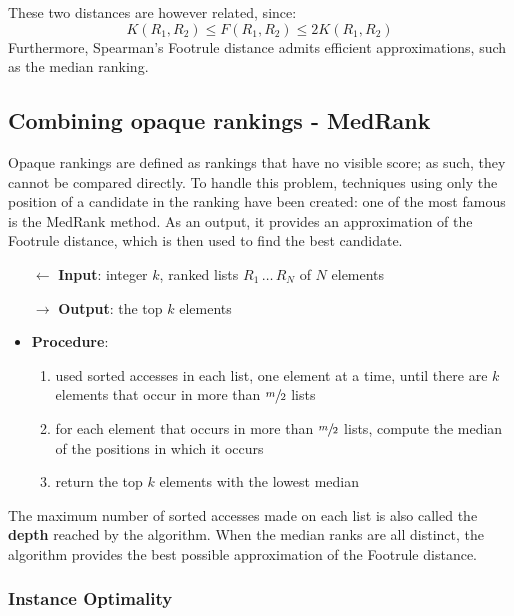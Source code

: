 \documentclass[english]{article}
\begin{document}
These two distances are however related, since:
\[ K(R_1, R_2) \leq F(R_1, R_2) \leq 2 K(R_1, R_2) \]
Furthermore, Spearman's Footrule distance admits efficient approximations, such as the median ranking.

\subsection{Combining opaque rankings - MedRank}

Opaque rankings are defined as rankings that have no visible score;
as such, they cannot be compared directly.
To handle this problem, techniques using only the position of a candidate in the ranking have been created: one of the most famous is the MedRank method.
As an output, it provides an approximation of the Footrule distance, which is then used to find the best candidate.

\begin{itemize}
  \item[\(\leftarrow\)] \textbf{Input}: integer \(k\), ranked lists \(R_1 \,\ldots \, R_N\) of \(N\) elements
  \item[\(\rightarrow\)] \textbf{Output}: the top \(k\) elements
  \item \textbf{Procedure}:
        \begin{enumerate}[label=step \arabic*., ref=step (\arabic*), widest*=7, leftmargin=*, labelindent=1em]
          \item used sorted accesses in each list, one element at a time, until there are \(k\) elements that occur in more than \(\sfrac{m}{2}\) lists
          \item for each element that occurs in more than \(\sfrac{m}{2}\) lists, compute the median of the positions in which it occurs
          \item return the top \(k\) elements with the lowest median
        \end{enumerate}
\end{itemize}

The maximum number of sorted accesses made on each list is also called the \textbf{depth} reached by the algorithm.
When the median ranks are all distinct, the algorithm provides the best possible approximation of the Footrule distance.

\subsubsection{Instance Optimality}
\end{document}
